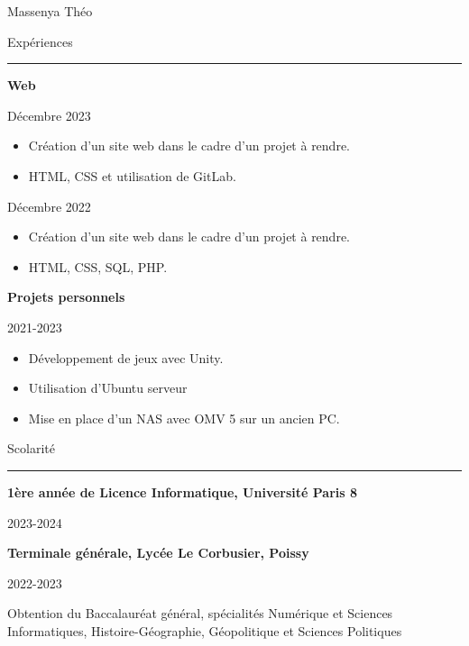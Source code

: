 \documentclass{letter}
\begin{document}
\begin{minipage}[t]{0.60\textwidth}
\setlength{\baselineskip}{1.5\baselineskip}
\vspace{0.8cm}
{\huge Massenya Théo}

\vspace{0.5cm}

{\large Expériences}
\rule{\linewidth}{0.4pt}

{\large \textbf{Web}}

{\small Décembre 2023}

\begin{itemize}
    \item Création d'un site web dans le cadre d'un projet à rendre.
    \item HTML, CSS et utilisation de GitLab.
\end{itemize}

{\small Décembre 2022}

\begin{itemize}
    \item Création d'un site web dans le cadre d'un projet à rendre.
    \item HTML, CSS, SQL, PHP.
\end{itemize}

{\large \textbf{Projets personnels }}

{\small 2021-2023}

\begin{itemize}
    \item Développement de jeux avec Unity.
    \item Utilisation d'Ubuntu serveur
    \item Mise en place d'un NAS avec OMV 5 sur un ancien PC.
\end{itemize}

{\large Scolarité}
\rule{\linewidth}{0.4pt}

{\large \textbf{1ère année de Licence Informatique, Université Paris 8}}

{\small 2023-2024}

{\large \textbf{Terminale générale, Lycée Le Corbusier, Poissy}}

{\small  2022-2023}

{\small Obtention du Baccalauréat général,  spécialités Numérique et Sciences Informatiques, Histoire-Géographie, Géopolitique et Sciences Politiques}

\end{minipage}
\end{document}
